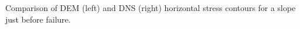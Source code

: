 \label{fig:S12DNS} Comparison of DEM (left) and DNS (right) horizontal stress contours for a slope just before failure.  